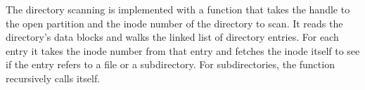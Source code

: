 The directory scanning is implemented with a function that takes the handle to the open
partition and the inode number of the directory to scan. It reads the directory's data blocks
and walks the linked list of directory entries. For each entry it takes the inode number from
that entry and fetches the inode itself to see if the entry refers to a file or a subdirectory.
For subdirectories, the function recursively calls itself.
